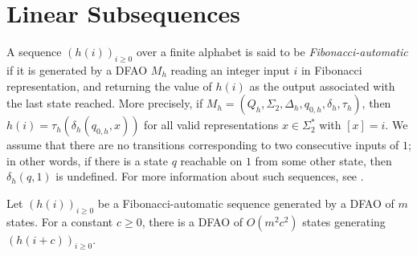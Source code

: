 \documentclass[12pt,reqno]{article}
\begin{document}
\section{Linear Subsequences}
\label{section:lin-subseq}

A sequence $(h(i))_{i \geq 0}$ over a finite alphabet is said to be {\it Fibonacci-automatic} if it is generated 
by a DFAO $M_h$ reading an integer input $i$ in Fibonacci representation,
and returning the value of $h(i)$ as the output associated with the last
state reached.  More precisely, if $M_h = (Q_h, \Sigma_2, \Delta_h, q_{0,h}, \delta_h, \tau_h)$, then $h(i) = \tau_h(\delta_h(q_{0,h}, x))$ for all
 valid representations $x \in \Sigma_2^*$ with $[x] = i$. We assume that there are no transitions corresponding to
two consecutive inputs of $1$; in other words, if there is a state $q$ reachable on $1$ from some other state, then $\delta_h(q,1)$ is undefined. For more information about such sequences, see \cite{mousavi_decision_2016}.





\begin{theorem} \label{theorem:sc-h(i+c)}
    Let $(h(i))_{i \geq 0}$ be a Fibonacci-automatic sequence generated by a DFAO of $m$ states. For a constant $c \geq 0$, there is a DFAO of $O(m^2c^2)$ states generating $(h(i+c))_{i \geq 0}$.
\end{theorem}
\end{document}
